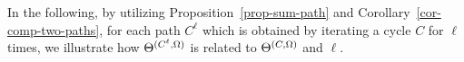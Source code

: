 In the following, by utilizing Proposition~\ref{prop-sum-path} and Corollary~\ref{cor-comp-two-paths}, for each path $C^{\ell}$ which is obtained by iterating a cycle $C$ for $\ell$ times, we illustrate how $\Theta^{(C^\ell,\Omega)}$ is related to $\Theta^{(C,\Omega)}$ and $\ell$.





%
% 

